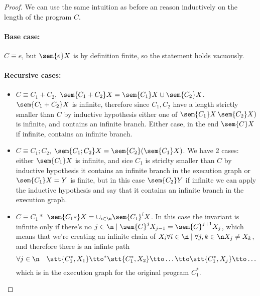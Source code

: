 \begin{proof}
  We can use the same intuition as before an reason inductively on the
  length of the program \(C\).
  \paragraph*{Base case:\\}
  \(C\equiv e\), but \(\sem{e}X\) is by definition finite, so the
  statement holds vacuously.
  \paragraph*{Recursive cases:\\}
  \begin{itemize}
  \item \(C\equiv C_1 + C_2\), \(\sem{C_1 + C_2} X = \sem{C_1}X \cup
    \sem{C_2}X\). \(\sem{C_1 + C_2} X\) is infinite, therefore since
    \(C_1, C_2\) have a length strictly smaller than \(C\) by
    inductive hypothesis either one of \(\sem{C_1}X\, \sem{C_2}X)\) is
    infinite, and contains an infinite branch. Either case, in the end
    \(\sem{C}X\) if infinite, contains an infinite branch.
  \item \(C\equiv C_1;C_2\), \(\sem{C_1;C_2}X =
    \sem{C_2}(\sem{C_1}X)\). We have 2 cases: either \(\sem{C_1}X\)
    is infinite, and sice \(C_1\) is striclty smaller than \(C\) by
    inductive hypothesis it contains an infinite branch in the
    execution graph or \(\sem{C_1}X = Y\) is finite, but in this case
    \(\sem{C_2}Y\) if infinite we can apply the inductive hypothesis
    and say that it contains an infinite branch in the execution
    graph.
  \item \(C \equiv C_1*\) \(\sem{C_1*}X =
    \cup_{i\in\n}\sem{C_1}^iX\). In this case the invariant is
    infinite only if there's no \(j\in\n\mid \sem{C}^jX_{j-1} =
    \sem{C}^{j+1}X_{j}\), which means that we're creating an infinite
    chain of \(X_i \forall i \in \n \mid \forall j,k \in \n X_j \neq
    X_k\), and therefore there is an infinte path \[\forall j \in \n
    \quad \stt{C_1^*, X_1} \tto^* \stt{C_1^*, X_2} \tto \dots \tto
    \stt{C_1^*, X_j} \tto \dots\] which is in the execution graph for
    the original program \(C_1^*\).

  \end{itemize}
\end{proof}

